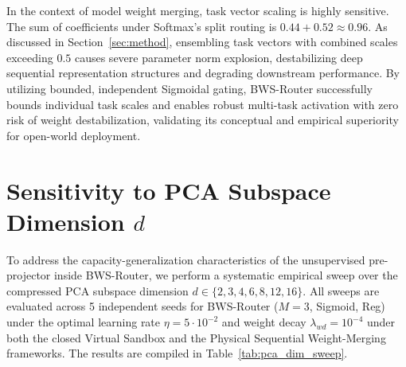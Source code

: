 In the context of model weight merging, task vector scaling is highly sensitive. The sum of coefficients under Softmax's split routing is $0.44 + 0.52 \approx 0.96$. As discussed in Section~\ref{sec:method}, ensembling task vectors with combined scales exceeding $0.5$ causes severe parameter norm explosion, destabilizing deep sequential representation structures and degrading downstream performance. By utilizing bounded, independent Sigmoidal gating, BWS-Router successfully bounds individual task scales and enables robust multi-task activation with zero risk of weight destabilization, validating its conceptual and empirical superiority for open-world deployment.

\section{Sensitivity to PCA Subspace Dimension $d$}
\label{app:pca_dim_sweep}
To address the capacity-generalization characteristics of the unsupervised pre-projector inside BWS-Router, we perform a systematic empirical sweep over the compressed PCA subspace dimension $d \in \{2, 3, 4, 6, 8, 12, 16\}$. All sweeps are evaluated across 5 independent seeds for BWS-Router ($M=3$, Sigmoid, Reg) under the optimal learning rate $\eta = 5 \cdot 10^{-2}$ and weight decay $\lambda_{wd} = 10^{-4}$ under both the closed Virtual Sandbox and the Physical Sequential Weight-Merging frameworks. The results are compiled in Table~\ref{tab:pca_dim_sweep}.

